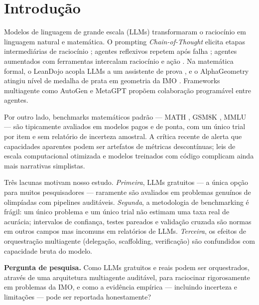 \section{Introdução}
\label{sec:intro}

Modelos de linguagem de grande escala (LLMs) transformaram o raciocínio em
linguagem natural e matemática. O prompting \emph{Chain-of-Thought} elicita
etapas intermediárias de raciocínio \citep{wei_cot}; agentes reflexivos
repetem após falha \citep{shinn_reflexion}; agentes aumentados com
ferramentas intercalam raciocínio e ação \citep{yao_react}. Na matemática
formal, o LeanDojo acopla LLMs a um assistente de prova
\citep{yang_leandojo}, e o AlphaGeometry atingiu nível de medalha de prata
em geometria da IMO \citep{alpha_geometry}. Frameworks multiagente como
AutoGen \citep{wu_autogen} e MetaGPT \citep{hong_metagpt} propõem
colaboração programável entre agentes.

Por outro lado, benchmarks matemáticos padrão --- MATH \citep{hendrycks_math},
GSM8K \citep{cobbe_gsm8k}, MMLU \citep{hendrycks_mmlu} --- são tipicamente
avaliados em modelos pagos e de ponta, com um único trial por item e sem
relatório de incerteza amostral. A crítica recente de
\citet{schaeffer_mirage} alerta que capacidades aparentes podem ser
artefatos de métricas descontínuas; leis de escala computacional otimizada
\citep{hoffmann_chinchilla} e modelos treinados com código
\citep{chen_codex} complicam ainda mais narrativas simplistas.

Três lacunas motivam nosso estudo. \emph{Primeira}, LLMs gratuitos --- a
única opção para muitos pesquisadores --- raramente são avaliados em
problemas genuínos de olimpíadas com pipelines auditáveis. \emph{Segunda},
a metodologia de benchmarking é frágil: um único problema e um único trial
não estimam uma taxa real de acurácia; intervalos de confiança, testes
pareados e validação cruzada são normas em outros campos mas incomuns em
relatórios de LLMs. \emph{Terceira}, os efeitos de orquestração multiagente
(delegação, scaffolding, verificação) são confundidos com capacidade bruta
do modelo.

\textbf{Pergunta de pesquisa.} Como LLMs gratuitos e reais podem ser
orquestrados, através de uma arquitetura multiagente auditável, para
raciocinar rigorosamente em problemas da IMO, e como a evidência empírica
--- incluindo incerteza e limitações --- pode ser reportada honestamente?

